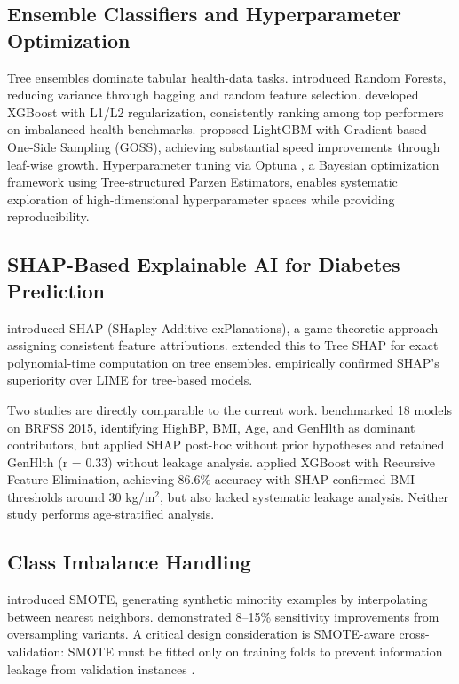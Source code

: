 ﻿\documentclass[12pt,a4paper]{article}
\begin{document}
\subsection{Ensemble Classifiers and Hyperparameter Optimization}

Tree ensembles dominate tabular health-data tasks. \citet{Breiman2001} introduced Random
Forests, reducing variance through bagging and random feature selection. \citet{Chen2016}
developed XGBoost with L1/L2 regularization, consistently ranking among top performers on
imbalanced health benchmarks. \citet{Ke2017} proposed LightGBM with Gradient-based One-Side
Sampling (GOSS), achieving substantial speed improvements through leaf-wise growth.
Hyperparameter tuning via Optuna \citep{Akiba2019}, a Bayesian optimization framework using
Tree-structured Parzen Estimators, enables systematic exploration of high-dimensional
hyperparameter spaces while providing reproducibility.

\subsection{SHAP-Based Explainable AI for Diabetes Prediction}

\citet{Lundberg2017} introduced SHAP (SHapley Additive exPlanations), a game-theoretic
approach assigning consistent feature attributions. \citet{Lundberg2019} extended this to
Tree SHAP for exact polynomial-time computation on tree ensembles. \citet{Ahmed2024}
empirically confirmed SHAP's superiority over LIME for tree-based models.

Two studies are directly comparable to the current work. \citet{Majcherek2025} benchmarked
18 models on BRFSS 2015, identifying HighBP, BMI, Age, and GenHlth as dominant contributors,
but applied SHAP post-hoc without prior hypotheses and retained GenHlth (r = 0.33) without
leakage analysis. \citet{Kutlu2024} applied XGBoost with Recursive Feature Elimination,
achieving 86.6\% accuracy with SHAP-confirmed BMI thresholds around 30 kg/m$^2$, but also
lacked systematic leakage analysis. Neither study performs age-stratified analysis.

\subsection{Class Imbalance Handling}

\citet{Chawla2002} introduced SMOTE, generating synthetic minority examples by interpolating
between nearest neighbors. \citet{Agyemang2025} demonstrated 8--15\% sensitivity improvements
from oversampling variants. A critical design consideration is SMOTE-aware cross-validation:
SMOTE must be fitted only on training folds to prevent information leakage from validation
instances \citep{Netayawijit2025, Rezki2024}.
\end{document}
